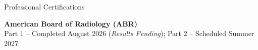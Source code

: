 \documentclass[
	11pt, %
]{resume} %
\begin{document}

\begin{rSection}{Professional Certifications}

	\textbf{American Board of Radiology (ABR)} \\
	Part 1 -- Completed August 2026 (\textit{Results Pending}); Part 2 -- Scheduled Summer 2027

\end{rSection}
\vspace{0.5cm}

\end{document}
